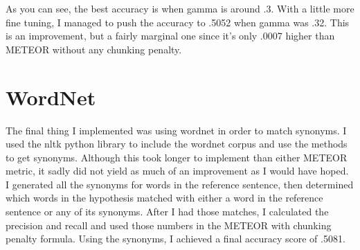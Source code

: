 \documentclass[11pt]{article}
\begin{document}
As you can see, the best accuracy is when gamma is around .3. With a little more fine tuning, I managed to push the accuracy to .5052 when gamma was .32. This is an improvement, but a fairly marginal one since it's only .0007 higher than METEOR without any chunking penalty. 

\section{WordNet}

The final thing I implemented was using wordnet in order to match synonyms. I used the nltk python library to include the wordnet corpus and use the methods to get synonyms. Although this took longer to implement than either METEOR metric, it sadly did not yield as much of an improvement as I would have hoped. I generated all the synonyms for words in the reference sentence, then determined which words in the hypothesis matched with either a word in the reference sentence or any of its synonyms. After I had those matches, I calculated the precision and recall and used those numbers in the METEOR with chunking penalty formula. Using the synonyms, I achieved a final accuracy score of .5081. 
\end{document}
